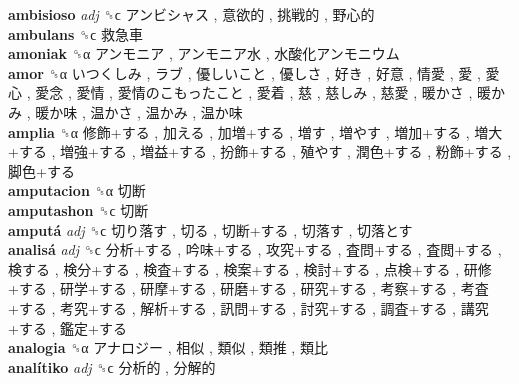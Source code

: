 \textbf{ambisioso} \emph{adj}  ␝ϲ   アンビシャス ,  意欲的 ,  挑戦的 ,  野心的   \\
\textbf{ambulans} ␝ϲ   救急車   \\
\textbf{amoniak} ␝α   アンモニア ,  アンモニア水 ,  水酸化アンモニウム   \\
\textbf{amor} ␝α   いつくしみ ,  ラブ ,  優しいこと ,  優しさ ,  好き ,  好意 ,  情愛 ,  愛 ,  愛心 ,  愛念 ,  愛情 ,  愛情のこもったこと ,  愛着 ,  慈 ,  慈しみ ,  慈愛 ,  暖かさ ,  暖かみ ,  暖か味 ,  温かさ ,  温かみ ,  温か味   \\
\textbf{amplia} ␝α   修飾+する ,  加える ,  加増+する ,  増す ,  増やす ,  増加+する ,  増大+する ,  増強+する ,  増益+する ,  扮飾+する ,  殖やす ,  潤色+する ,  粉飾+する ,  脚色+する   \\
\textbf{amputacion} ␝α   切断   \\
\textbf{amputashon} ␝ϲ   切断   \\
\textbf{amputá} \emph{adj}  ␝ϲ   切り落す ,  切る ,  切断+する ,  切落す ,  切落とす   \\
\textbf{analisá} \emph{adj}  ␝ϲ   分析+する ,  吟味+する ,  攻究+する ,  査問+する ,  査閲+する ,  検する ,  検分+する ,  検査+する ,  検案+する ,  検討+する ,  点検+する ,  研修+する ,  研学+する ,  研摩+する ,  研磨+する ,  研究+する ,  考察+する ,  考査+する ,  考究+する ,  解析+する ,  訊問+する ,  討究+する ,  調査+する ,  講究+する ,  鑑定+する   \\
\textbf{analogia} ␝α   アナロジー ,  相似 ,  類似 ,  類推 ,  類比   \\
\textbf{analítiko} \emph{adj}  ␝ϲ   分析的 ,  分解的   \\

